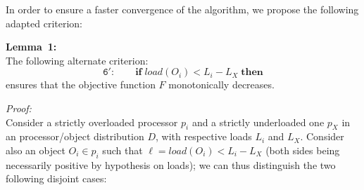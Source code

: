 In order to ensure a faster convergence of the algorithm, we propose
the following adapted criterion:
\par\textbf{Lemma~1:}\\
The following alternate criterion:
\[
\mathtt{6':} \qquad \mathrm{\mathbf{if}} \; load(O_i) < L_i - L_X
\; \mathrm{\mathbf{then}}
\]
ensures that the objective function $F$ monotonically decreases.
\par\textit{Proof:}\\
Consider a strictly overloaded processor $p_i$ and a strictly
underloaded one $p_X$ in an processor/object distribution $D$, with
respective loads $L_i$ and $L_X$.
Consider also an object $O_i\in{p_i}$ such that $\ell=load(O_i) <
L_i-L_X$ (both sides being necessarily positive by hypothesis on
loads); we can thus distinguish the two following disjoint cases:


